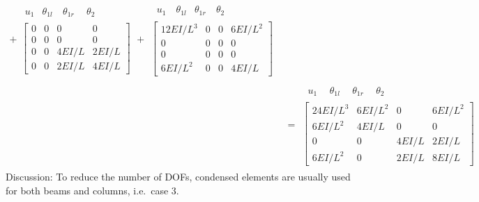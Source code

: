 \begin{example}
{\begin{align*}
  + \begin{array}{c}\begin{array}{cccc}u_1 & \theta_{1l} & \ \theta_{1r}\ & \ \theta_2\ \end{array}\\ \left[\begin{array}{cccc}0 & 0 & 0 & 0\\ 0 & 0 & 0 & 0\\ 0 & 0 & 4EI/L & 2EI/L\\ 0 & 0 & 2EI/L & 4EI/L\end{array}\right]\end{array}
  + \begin{array}{c}\begin{array}{cccc}\ u_1\ & \theta_{1l} & \theta_{1r} & \ \theta_2\ \end{array}\\ \left[\begin{array}{cccc}12EI/L^3 & 0 & 0 & 6EI/L^2\\ 0 & 0 & 0 & 0\\ 0 & 0 & 0 & 0\\ 6EI/L^2 & 0 & 0 & 4EI/L\end{array}\right]\end{array}\\
  &= \begin{array}{c}\begin{array}{cccc}\ u_1\ & \ \theta_{1l}\ & \ \theta_{1r}\ & \ \theta_2\ \end{array}\\ \left[\begin{array}{cccc}24EI/L^3 & 6EI/L^2 & 0 & 6EI/L^2\\ 6EI/L^2 & 4EI/L & 0 & 0\\ 0 & 0 & 4EI/L & 2EI/L\\ 6EI/L^2 & 0 & 2EI/L & 8EI/L\end{array}\right]\end{array}
\end{align*}}
Discussion: To reduce the number of DOFs, condensed elements are usually used for both beams and columns, i.e.\ case 3.
\end{example}

